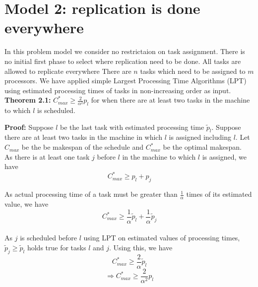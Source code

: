 \documentclass[10pt, conference, compsocconf]{IEEEtran}
\begin{document}
\section{Model 2: replication is done everywhere}
In this problem model we consider no restrictaion on task assignment.  There is no initial first phase to select where replication need to be done.  All tasks are allowed to replicate everywhere There are $ n$ tasks which need to be  assigned to $m$ processors. We have applied simple Largest Processing Time Algorithms (LPT) using estimated processing times of tasks in non-increasing order as input.  \\




\textbf{Theorem 2.1:} $C_{max}^{*} \geq {\frac{2}{\alpha^{2}}} p_l $ for when there are at least two tasks in the machine to which $l$ is scheduled.

\textbf{Proof:} Suppose $l$ be the last task with estimated processing time $\tilde p_l$. Suppose
there are at least two tasks in the machine in which $l$ is assigned including $l$. Let
$C_{max}$ be the be makespan of the schedule and $C_{max}^{*}$ be the optimal makespan.\\

As there is at least one task $j$ before $l$ in the machine to which $l$ is
assigned, we have
\begin{equation}\nonumber
C_{max}^{*}\geq p_l + p_j
\end{equation}



As actual processing time of a task must be greater than $\frac{1}{\alpha}$ times of its estimated value, we have
\begin{equation}\nonumber 
C_{max}^{*} \geq \frac{1}{\alpha}\tilde p_l +  \frac{1}{\alpha} \tilde p_j 
\end{equation}
\\
As $j$ is scheduled before $l$ using LPT on estimated values of processing times,  $\tilde p_j\geq   \tilde p_l$ holds true for tasks $l$ and $j$.  Using this, we have\\

\begin{equation}\nonumber
 C_{max}^{*} \geq \frac{2}{\alpha}\tilde p_l
 \end{equation}
\begin{equation}\nonumber 
\Rightarrow C_{max}^{*} \geq {\frac{2}{\alpha^{2}}} p_l  \end{equation}
\end{document}
